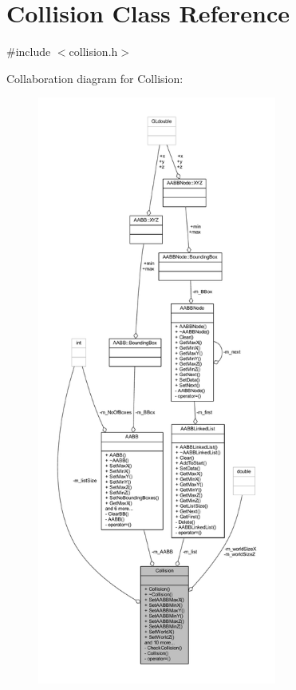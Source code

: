 \hypertarget{class_collision}{}\section{Collision Class Reference}
\label{class_collision}


{\ttfamily \#include $<$collision.\+h$>$}



Collaboration diagram for Collision\+:
\nopagebreak
\begin{figure}[H]
\begin{center}
\leavevmode
\includegraphics[height=550pt]{class_collision__coll__graph}
\end{center}
\end{figure}
